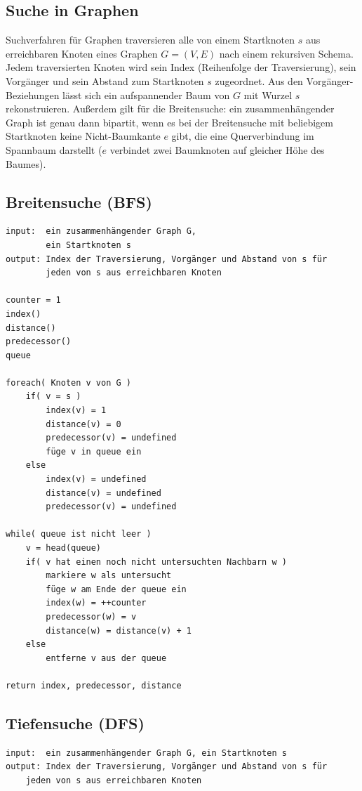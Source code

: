\documentclass[10pt,a4paper,landscape]{article}
\begin{document}
\begin{multicols*}{2}
\section{ Suche in Graphen }
    Suchverfahren für Graphen traversieren alle von einem Startknoten $s$ aus erreichbaren Knoten 
    eines Graphen $G = (V,E)$ nach einem rekursiven Schema. Jedem traversierten Knoten wird sein Index 
    (Reihenfolge der Traversierung), sein Vorgänger und sein Abstand zum Startknoten $s$ zugeordnet.
    Aus den Vorgänger-Beziehungen lässt sich ein aufspannender Baum von $G$ mit Wurzel $s$ rekonstruieren.
    \newline
    Außerdem gilt für die Breitensuche: ein zusammenhängender Graph ist genau dann bipartit, wenn es bei der Breitensuche mit beliebigem Startknoten 
    keine Nicht-Baumkante $e$ gibt, die eine Querverbindung im Spannbaum darstellt ($e$ verbindet zwei Baumknoten 
    auf gleicher Höhe des Baumes).
    \subsection{ Breitensuche (BFS) }
    \begin{verbatim}
input:  ein zusammenhängender Graph G, 
        ein Startknoten s
output: Index der Traversierung, Vorgänger und Abstand von s für 
        jeden von s aus erreichbaren Knoten

counter = 1
index()
distance()
predecessor()
queue

foreach( Knoten v von G )
    if( v = s )
        index(v) = 1
        distance(v) = 0
        predecessor(v) = undefined
        füge v in queue ein
    else
        index(v) = undefined
        distance(v) = undefined
        predecessor(v) = undefined

while( queue ist nicht leer )
    v = head(queue)
    if( v hat einen noch nicht untersuchten Nachbarn w )
        markiere w als untersucht
        füge w am Ende der queue ein
        index(w) = ++counter
        predecessor(w) = v
        distance(w) = distance(v) + 1
    else
        entferne v aus der queue

return index, predecessor, distance
    \end{verbatim}
    
    \subsection{ Tiefensuche (DFS) }
    \begin{verbatim}
input:  ein zusammenhängender Graph G, ein Startknoten s
output: Index der Traversierung, Vorgänger und Abstand von s für 
    jeden von s aus erreichbaren Knoten


\end{verbatim}
\end{multicols*}
\end{document}
